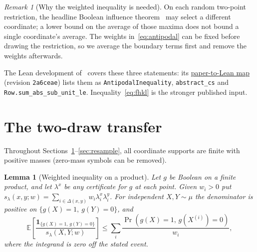 \documentclass[11pt]{article}
\numberwithin{equation}{section}
\newcommand{\E}{\mathbb{E}}
\theoremstyle{plain}
\newtheorem{lem}{Lemma}
\theoremstyle{remark}
\newtheorem{remark}[theorem]{Remark}
\begin{document}
\begin{remark}[Why the weighted inequality is needed]
On each random two-point restriction, the headline Boolean influence theorem~\cite[Theorem~1.1]{Tur26} may select a different coordinate; a lower bound on the average of those maxima does not bound a single coordinate's average. The weights in~\eqref{eq:antipodal} can be fixed before drawing the restriction, so we average the boundary terms first and remove the weights afterwards.
\end{remark}

The Lean development of~\cite{Tur26} covers these three statements: its \href{https://github.com/physical-superintelligence/aaronson-ambainis/blob/2a6ceae/notes/PAPER_TO_LEAN.md}{paper-to-Lean map} (revision \texttt{2a6ceae}) lists them as \texttt{AntipodalInequality}, \texttt{abstract\_cs} and \texttt{Row.sum\_abs\_sub\_unit\_le}. Inequality~\eqref{eq:fhkl} is the stronger published input.

\section{The two-draw transfer}\label{sec:twodraw}
Throughout Sections~\ref{sec:twodraw}--\ref{sec:resample}, all coordinate supports are finite with positive masses (zero-mass symbols can be removed).

\begin{lem}[Weighted inequality on a product]\label{lem:A}
Let $g$ be Boolean on a finite product, and let $\lambda^x$ be any certificate for $g$ at each point. Given $w_i>0$ put $s_\lambda(x,y;w)=\sum_{i\in\Delta(x,y)}w_i\lambda_i^x\lambda_i^y$. For independent $X,Y\sim\mu$ the denominator is positive on $\{g(X)=1,\ g(Y)=0\}$, and
\begin{equation}\label{eq:lemA}
\E\left[\frac{\mathbf1_{\{g(X)=1,\,g(Y)=0\}}}{s_\lambda(X,Y;w)}\right]
\le\sum_i\frac{\Pr(g(X)=1,\,g(X^{(i)})=0)}{w_i},
\end{equation}
where the integrand is zero off the stated event.
\end{lem}
\end{document}
